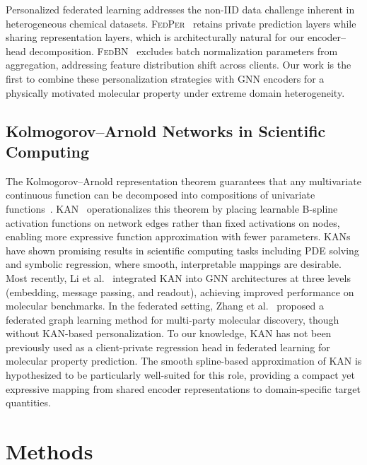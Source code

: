 \documentclass[twocolumn]{article}
\newcommand{\FedPer}{\textsc{FedPer}}
\newcommand{\FedBN}{\textsc{FedBN}}
\begin{document}
Personalized federated learning addresses the non-IID data challenge inherent in heterogeneous chemical datasets.
\FedPer{}~\cite{Arivazhagan2019_FedPer} retains private prediction layers while sharing representation layers, which is architecturally natural for our encoder--head decomposition.
\FedBN{}~\cite{Li2021_FedBN} excludes batch normalization parameters from aggregation, addressing feature distribution shift across clients.
Our work is the first to combine these personalization strategies with GNN encoders for a physically motivated molecular property under extreme domain heterogeneity.

\subsection{Kolmogorov--Arnold Networks in Scientific Computing}

The Kolmogorov--Arnold representation theorem guarantees that any multivariate continuous function can be decomposed into compositions of univariate functions~\cite{KAN2024}.
KAN~\cite{KAN2024} operationalizes this theorem by placing learnable B-spline activation functions on network edges rather than fixed activations on nodes, enabling more expressive function approximation with fewer parameters.
KANs have shown promising results in scientific computing tasks including PDE solving and symbolic regression, where smooth, interpretable mappings are desirable.
Most recently, Li et al.~\cite{KAGNN2025} integrated KAN into GNN architectures at three levels (embedding, message passing, and readout), achieving improved performance on molecular benchmarks.
In the federated setting, Zhang et al.~\cite{FedLG2025} proposed a federated graph learning method for multi-party molecular discovery, though without KAN-based personalization.
To our knowledge, KAN has not been previously used as a client-private regression head in federated learning for molecular property prediction.
The smooth spline-based approximation of KAN is hypothesized to be particularly well-suited for this role, providing a compact yet expressive mapping from shared encoder representations to domain-specific target quantities.


\section{Methods}\label{sec:methods}
\end{document}
